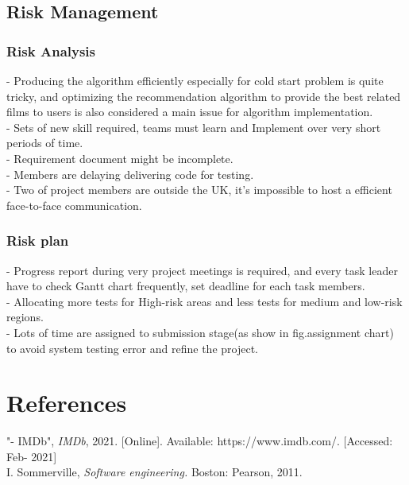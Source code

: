 \documentclass[10pt]{article}
\begin{document}
\subsection{Risk Management}
\subsubsection{Risk Analysis}
- Producing the algorithm efficiently especially for cold start problem is quite tricky, and optimizing the recommendation algorithm to provide the best related films to users is also considered a main issue for algorithm implementation.\\
- Sets of new skill required, teams must learn and Implement over very short periods of time.\\
- Requirement document might be incomplete.\\
- Members are delaying delivering code for testing.\\
- Two of project members are outside the UK, it’s impossible to host a efficient face-to-face communication. 
\subsubsection{Risk plan}
- Progress report during very project meetings is required, and every task leader have to check Gantt chart frequently, set deadline for each task members. \\
- Allocating more tests for High-risk areas and less tests for medium and low-risk regions.\\
- Lots of time are assigned to submission stage(as show in fig.assignment chart) to avoid system testing error and refine the project. 


\section {References}
\noindent [1] "- IMDb", \textit{IMDb}, 2021. [Online]. Available: https://www.imdb.com/. [Accessed: Feb- 2021]\\
\noindent [2] I. Sommerville, \textit{Software engineering.} Boston: Pearson, 2011.\\
\end{document}
